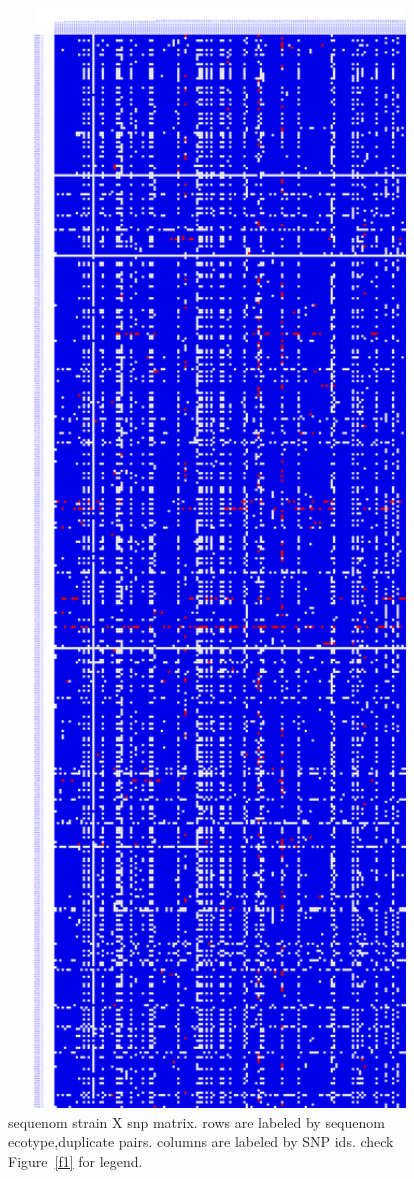 \documentclass[a4paper,10pt]{article}
\begin{document}
\begin{figure}
\includegraphics[width=1\textwidth, height=1\textheight]{figures/sequenom_with_strains_matched_to_2010pcr_accession2ecotype_complete_y3.png}
\caption{sequenom strain X snp matrix. rows are labeled by sequenom ecotype,duplicate pairs. columns are labeled by SNP ids. check Figure~\ref{f1} for legend.}\label{f3}
\end{figure}
\end{document}

